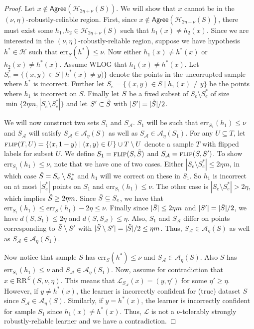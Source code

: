 \documentclass[11pt]{article}
\newcommand{\CR}{\text{RR}}
\newcommand{\err}{\mathrm{err}}
\newcommand{\0}{\mathbf{0}}
\newcommand{\1}{\mathbf{1}}
\newcommand{\cA}{\mathcal{A}}
\newcommand{\cH}{\mathcal{H}}
\newcommand{\cL}{\mathcal{L}}
\newcommand{\Agree}{\mathsf{Agree}}
\begin{document}
\begin{proof}
Let $x \not\in \Agree(\cH_{2\eta+\nu}(S))$.  We will show that $x$ cannot be in the $(\nu,\eta)$-robustly-reliable region.  First, since $x \not\in \Agree(\cH_{2\eta+\nu}(S))$, there must exist some $h_1,h_2 \in \cH_{2\eta+\nu}(S)$ such that $h_1(x) \neq h_2(x)$. Since we are interested in the $(\nu,\eta)$-robustly-reliable region, suppose we have hypothesis $h^*\in\cH$ such that $\err_S(h^*)\le \nu$. Now either $h_1(x)\ne h^*(x)$ or $h_2(x)\ne h^*(x)$. Assume WLOG that $h_1(x)\ne h^*(x)$. Let $S_e^*=\{(x,y)\in S\mid h^*(x)\ne y)\}$ denote the points in the uncorrupted sample where $h^*$ is incorrect. Further let $S_e=\{(x,y)\in S\mid h_1(x)\ne y\}$ be the points where $h_1$ is incorrect on $S$. Finally let $\Tilde{S}$ be a fixed subset of $S_e\setminus S_e^*$ of size $\min\{2\eta m,|S_e\setminus S_e^*|\}$ and let $S'\subset \Tilde{S}$ with $|S'|=|\Tilde{S}|/2$.

We will now construct two sets $S_1$ and $S_\cA$. $S_1$ will be such that $\err_{S_1}(h_1)\le\nu$ and $S_\cA$ will satisfy $S_\cA\in \cA_\eta(S)$ as well as $S_\cA\in \cA_\eta(S_1)$. For any $U\subseteq T$, let $\textsc{flip}(T,U)=\{(x,1-y)\mid (x,y)\in U\}\cup T\setminus U$ denote a sample $T$ with flipped labels for subset $U$. We define $S_1=\textsc{flip}(S,\Tilde{S})$ and $S_\cA=\textsc{flip}(S,S')$. To show $\err_{S_1}(h_1)\le\nu$, note that we have one of two cases. Either $|S_e\setminus S_e^*|\le 2\eta m$, in which case $\Tilde{S}=S_e\setminus S_e^*$ and $h_1$ will we correct on these in $S_1$. So $h_1$ is incorrect on at most $|S_e^*|$ points on $S_1$ and $\err_{S_1}(h_1)\le\nu$. The other case is $|S_e\setminus S_e^*|> 2\eta$, which implies $\Tilde{S}\ge 2\eta m$. Since $\Tilde{S}\subseteq S_e$, we have that $\err_{S_1}(h_1)\le \err_{S}(h_1)-2\eta\le \nu$. Finally since $|\Tilde{S}|\le 2\eta m$ and $|S'|=|\Tilde{S}|/2$, we have $d(S,S_1)\le 2\eta$ and $d(S,S_\cA)\le \eta$. Also, $S_1$ and $S_\cA$ differ on points corresponding to $\Tilde{S}\setminus S'$ with $|\Tilde{S}\setminus S'|=|\Tilde{S}|/2\le \eta m$. Thus, $S_\cA\in \cA_\eta(S)$ as well as $S_\cA\in \cA_\eta(S_1)$.

Now notice that sample $S$ has $\err_S(h^*)\le\nu$ and $S_\cA\in\cA_\eta(S)$. Also $S$ has $\err_{S_1}(h_1)\le\nu$ and $S_\cA\in\cA_\eta(S_1)$. Now, assume for contradiction that $x \in \CR^\cL(S,\nu,\eta)$.  This means that $\cL_{S_\cA}(x)=(y,\eta')$ for some $\eta'\geq \eta$.  However, if $y\ne h^*(x)$, the learner is incorrectly confident for (true) dataset $S$ since $S_\cA\in\cA_\eta(S)$.
Similarly, if $y=h^*(x)$, the learner is incorrectly confident for sample $S_1$ since $h_1(x)\ne h^*(x)$. Thus, $\cL$ is not a $\nu$-tolerably strongly robustly-reliable learner and we have a contradiction.
\end{proof}
\end{document}

